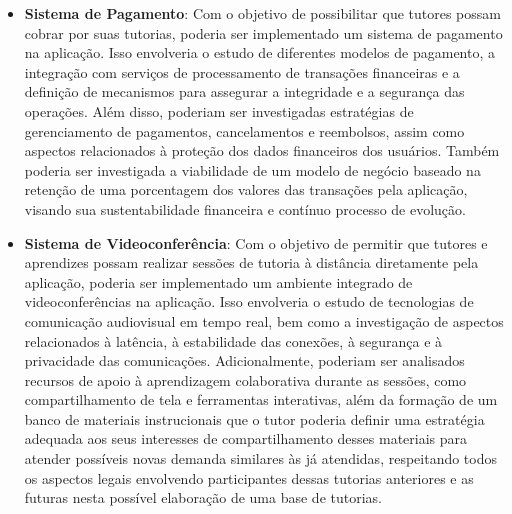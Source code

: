 \begin{itemize}

\item \textbf{Sistema de Pagamento}: Com o objetivo de possibilitar que tutores possam cobrar por suas tutorias, poderia ser implementado um sistema de pagamento na aplicação. Isso envolveria o estudo de diferentes modelos de pagamento, a integração com serviços de processamento de transações financeiras e a definição de mecanismos para assegurar a integridade e a segurança das operações. Além disso, poderiam ser investigadas estratégias de gerenciamento de pagamentos, cancelamentos e reembolsos, assim como aspectos relacionados à proteção dos dados financeiros dos usuários. Também poderia ser investigada a viabilidade de um modelo de negócio baseado na retenção de uma porcentagem dos valores das transações pela aplicação, visando sua sustentabilidade financeira e contínuo processo de evolução.

\item \textbf{Sistema de Videoconferência}: Com o objetivo de permitir que tutores e aprendizes possam realizar sessões de tutoria à distância diretamente pela aplicação, poderia ser implementado um ambiente integrado de videoconferências na aplicação. Isso envolveria o estudo de tecnologias de comunicação audiovisual em tempo real, bem como a investigação de aspectos relacionados à latência, à estabilidade das conexões, à segurança e à privacidade das comunicações. Adicionalmente, poderiam ser analisados recursos de apoio à aprendizagem colaborativa durante as sessões, como compartilhamento de tela e ferramentas interativas, além da formação de um banco de materiais instrucionais que o tutor poderia definir uma estratégia adequada aos seus interesses de compartilhamento desses materiais para atender possíveis novas demanda similares às já atendidas, respeitando todos os aspectos legais envolvendo participantes dessas tutorias anteriores e as futuras nesta possível elaboração de uma base de tutorias.

\end{itemize}
